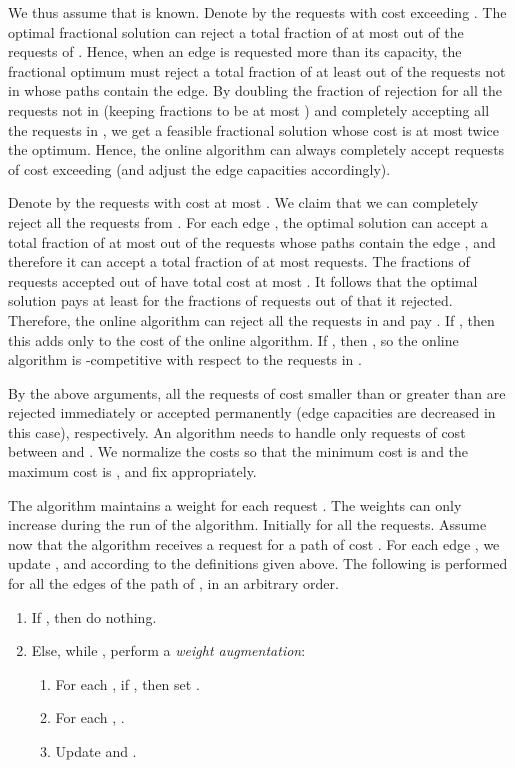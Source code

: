 \documentclass{sig-alternate}
\begin{document}
We thus assume that  is known. Denote by  the
requests with cost exceeding . The optimal fractional
solution can reject a total fraction of at most  out of the
requests of . Hence, when an edge is requested more than
its capacity, the fractional optimum must reject a total fraction
of at least  out of the requests not in  whose paths
contain the edge. By doubling the fraction of rejection for all
the requests not in  (keeping fractions to be at most
) and completely accepting all the requests in , we
get a feasible fractional solution whose cost is at most twice the
optimum. Hence, the online algorithm can always completely accept
requests of cost exceeding  (and adjust the edge
capacities  accordingly).

Denote by  the requests with cost at most
. We claim that we can completely reject all the
requests from . For each edge , the optimal solution
can accept a total fraction of at most  out of the requests
whose paths contain the edge , and therefore it can accept a
total fraction of at most  requests. The fractions of requests
accepted out of  have total cost at most . It follows that the optimal solution pays
at least  for the fractions of requests
out of  that it rejected. Therefore, the online
algorithm can reject all the requests in  and pay
. If , then this adds
only  to the cost of the online algorithm. If
, then , so the online algorithm is
-competitive with respect to the requests in .

By the above arguments, all the requests of cost smaller than
 or greater than  are rejected immediately
or accepted permanently (edge capacities are decreased in this
case), respectively. An algorithm needs to handle only requests
of cost between  and . We normalize the
costs so that the minimum cost is  and the maximum cost is , and fix  appropriately.

The algorithm maintains a weight  for each request . The
weights can only increase during the run of the algorithm.
Initially  for all the requests. Assume now that the
algorithm receives a request  for a path of cost . For
each edge , we update ,  and  according to
the definitions given above. The following is performed for all
the edges  of the path of , in an arbitrary order.

\begin{enumerate}
    \item If , then do
    nothing.
    \item Else, while , perform a {\em weight augmentation}:
    \begin{enumerate}
        \item For each , if , then set
        .\label{alg1}
        \item For each , .\label{alg2}
        \item Update  and .
    \end{enumerate}
\end{enumerate}
\end{document}
